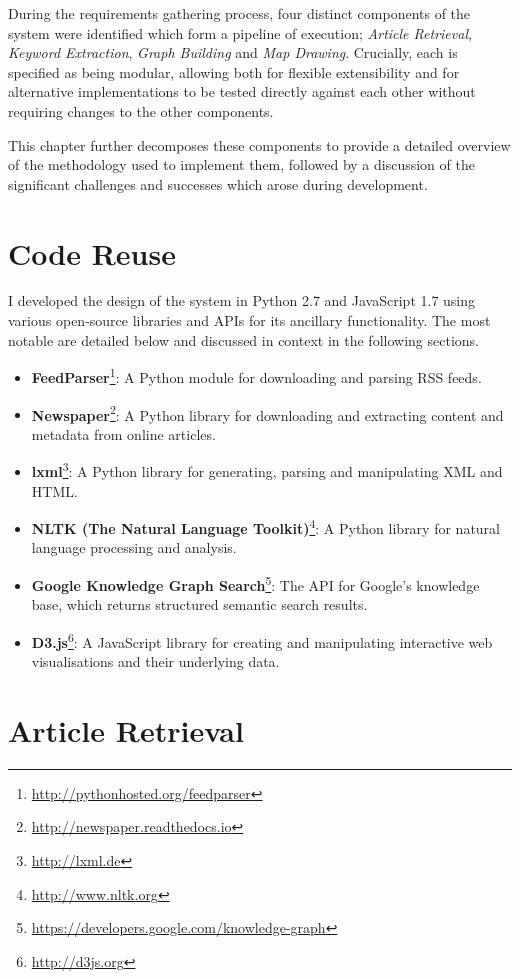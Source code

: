 During the requirements gathering process, four distinct components of the system were identified which form a pipeline of execution; \textit{Article Retrieval}, \textit{Keyword Extraction}, \textit{Graph Building} and \textit{Map Drawing}. Crucially, each is specified as being modular, allowing both for flexible extensibility and for alternative implementations to be tested directly against each other without requiring changes to the other components.

This chapter further decomposes these components to provide a detailed overview of the methodology used to implement them, followed by a discussion of the significant challenges and successes which arose during development.

\section{Code Reuse}
I developed the design of the system in Python 2.7 and JavaScript 1.7 using various open-source libraries and APIs for its ancillary functionality. The most notable are detailed below and discussed in context in the following sections.

\begin{itemize}[noitemsep]
	\item\textbf{FeedParser}\footnote{\url{http://pythonhosted.org/feedparser}}: A Python module for downloading and parsing RSS feeds.
	\item\textbf{Newspaper}\footnote{\url{http://newspaper.readthedocs.io}}: A Python library for downloading and extracting content and metadata from online articles.
	\item\textbf{lxml}\footnote{\url{http://lxml.de}}: A Python library for generating, parsing and manipulating XML and HTML.
	\item\textbf{NLTK (The Natural Language Toolkit)}\footnote{\url{http://www.nltk.org}}: A Python library for natural language processing and analysis.
	\item\textbf{Google Knowledge Graph Search}\footnote{\url{https://developers.google.com/knowledge-graph}}: The API for Google's knowledge base, which returns structured semantic search results.
	\item\textbf{D3.js}\footnote{\url{http://d3js.org}}: A JavaScript library for creating and manipulating interactive web visualisations and their underlying data.
\end{itemize}

\section{Article Retrieval}

